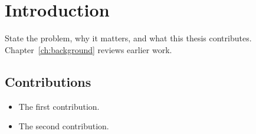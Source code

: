\chapter{Introduction}
\label{ch:intro}

State the problem, why it matters, and what this thesis contributes. Chapter~\ref{ch:background}
reviews earlier work.

\section{Contributions}
\begin{itemize}
  \item The first contribution.
  \item The second contribution.
\end{itemize}
